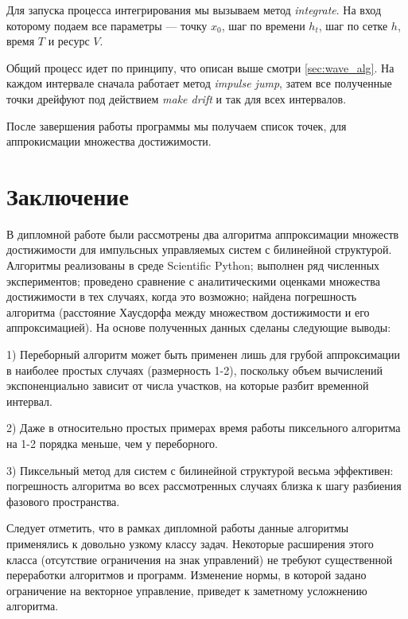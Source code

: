 \documentclass[a4paper,12pt]{article}
\begin{document}
Для запуска процесса интегрирования мы вызываем метод
\emph{integrate}. На вход которому подаем все параметры --- точку
$x_0$, шаг по времени $h_t$, шаг по сетке $h$, время $T$ и ресурс $V$.

Общий процесс идет по принципу, что описан выше смотри
\ref{sec:wave_alg}. На каждом интервале сначала работает метод
\emph{impulse jump}, затем все полученные точки дрейфуют под действием
\emph{make drift} и так для всех интервалов.

После завершения работы программы мы получаем список точек, для
аппрокисмации множества достижимости.

\section*{Заключение}
\label{sec:conclusion}

В дипломной работе были рассмотрены два алгоритма аппроксимации множеств
достижимости для импульсных управляемых систем с билинейной структурой.
Алгоритмы реализованы в среде Scientific Python; выполнен ряд численных
экспериментов; проведено сравнение с аналитическими оценками множества
достижимости в тех случаях, когда это возможно; найдена погрешность алгоритма
(расстояние Хаусдорфа между множеством достижимости и его аппроксимацией). На
основе полученных данных сделаны следующие выводы:

1) Переборный алгоритм может быть применен лишь для грубой аппроксимации в
наиболее простых случаях (размерность 1-2), поскольку объем вычислений
экспоненциально зависит от числа участков, на которые разбит временной
интервал.

2) Даже в относительно простых примерах время работы пиксельного алгоритма на
1-2 порядка меньше, чем у переборного.

3) Пиксельный метод для систем с билинейной структурой весьма эффективен:
погрешность алгоритма во всех рассмотренных случаях близка к шагу разбиения
фазового пространства.

Следует отметить, что в рамках дипломной работы данные алгоритмы применялись к
довольно узкому классу задач. Некоторые расширения этого класса (отсутствие
ограничения на знак управлений) не требуют существенной переработки алгоритмов
и программ. Изменение нормы, в которой задано ограничение на векторное
управление, приведет к заметному усложнению алгоритма.
\end{document}
